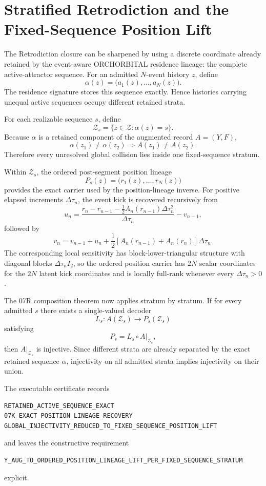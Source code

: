 \chapter{Stratified Retrodiction and the Fixed-Sequence Position Lift}
\label{chap:stratified-position-lift}

The Retrodiction closure can be sharpened by using a discrete coordinate already retained by the event-aware ORCHORBITAL residence lineage: the complete active-attractor sequence. For an admitted $N$-event history $z$, define
\[
\alpha(z)=\bigl(a_1(z),\ldots,a_N(z)\bigr).
\]
The residence signature stores this sequence exactly. Hence histories carrying unequal active sequences occupy different retained strata.

For each realizable sequence $s$, define
\[
\mathcal Z_s=\{z\in\mathcal Z:\alpha(z)=s\}.
\]
Because $\alpha$ is a retained component of the augmented record $A=(Y,F)$,
\[
\alpha(z_1)\neq\alpha(z_2)
\Longrightarrow
A(z_1)\neq A(z_2).
\]
Therefore every unresolved global collision lies inside one fixed-sequence stratum.

Within $\mathcal Z_s$, the ordered post-segment position lineage
\[
P_s(z)=\bigl(r_1(z),\ldots,r_N(z)\bigr)
\]
provides the exact carrier used by the position-lineage inverse. For positive elapsed increments $\Delta\tau_n$, the event kick is recovered recursively from
\[
u_n=
\frac{r_n-r_{n-1}-\tfrac12 A_n(r_{n-1})\Delta\tau_n^2}
{\Delta\tau_n}-v_{n-1},
\]
followed by
\[
v_n=v_{n-1}+u_n+
\frac12\left[A_n(r_{n-1})+A_n(r_n)\right]\Delta\tau_n.
\]
The corresponding local sensitivity has block-lower-triangular structure with diagonal blocks $\Delta\tau_n I_2$, so the ordered position carrier has $2N$ scalar coordinates for the $2N$ latent kick coordinates and is locally full-rank whenever every $\Delta\tau_n>0$.

The 07R composition theorem now applies stratum by stratum. If for every admitted $s$ there exists a single-valued decoder
\[
L_s:A(\mathcal Z_s)\rightarrow P_s(\mathcal Z_s)
\]
satisfying
\[
P_s=L_s\circ A|_{\mathcal Z_s},
\]
then $A|_{\mathcal Z_s}$ is injective. Since different strata are already separated by the exact retained sequence $\alpha$, injectivity on all admitted strata implies injectivity on their union.

The executable certificate records
\begin{verbatim}
RETAINED_ACTIVE_SEQUENCE_EXACT
07K_EXACT_POSITION_LINEAGE_RECOVERY
GLOBAL_INJECTIVITY_REDUCED_TO_FIXED_SEQUENCE_POSITION_LIFT
\end{verbatim}
and leaves the constructive requirement
\begin{verbatim}
Y_AUG_TO_ORDERED_POSITION_LINEAGE_LIFT_PER_FIXED_SEQUENCE_STRATUM
\end{verbatim}
explicit.

